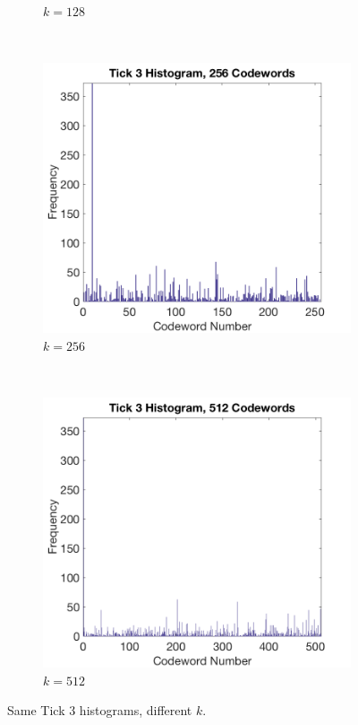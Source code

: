\documentclass[a4paper, 10pt, conference]{ieeeconf}
\begin{document}
\begin{figure}[!ht]
\begin{subfigure}{0.45\linewidth}
      \caption{$k = 128$}
      \label{fig:diff128}
    \end{subfigure}
    \\
    \begin{subfigure}{0.45\linewidth}
      \includegraphics[width=\textwidth]{img/tick3_256}
      \caption{$k = 256$}
      \label{fig:diff256}
    \end{subfigure}
    ~
    \begin{subfigure}{0.45\linewidth}
      \includegraphics[width=\textwidth]{img/tick3_512}
      \caption{$k = 512$}
      \label{fig:diffk512}
    \end{subfigure}

  \caption{Same Tick 3 histograms, different $k$.}
  \label{fig:diffk}
\end{figure}
\end{document}
